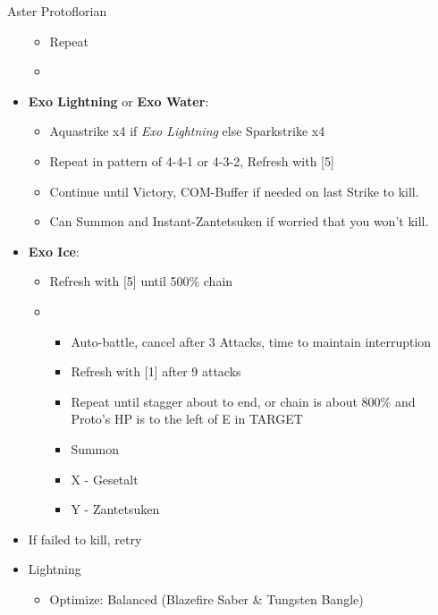 \begin{battle}[1:43]{Aster Protoflorian}
\begin{multicols}{2}
\begin{itemize}
\begin{itemize}
				      \item Repeat
				      \item \stagger
			      \end{itemize}
			\item \textbf{Exo Lightning} or \textbf{Exo Water}:
			      \begin{itemize}
				      \item Aquastrike x4 if \textit{Exo Lightning} else Sparkstrike x4
				      \item Repeat in pattern of 4-4-1 or 4-3-2, Refresh with [5]
				      \item Continue until Victory, COM-Buffer if needed on last Strike to kill.
				      \item Can Summon and Instant-Zantetsuken if worried that you won't kill.
			      \end{itemize}
			\item \textbf{Exo Ice}:
			      \begin{itemize}
				      \item Refresh with [5] until 500\% chain
				      \item \sixth
				            \begin{itemize}
					            \item Auto-battle, cancel after 3 Attacks, time to maintain interruption
					            \item Refresh with [1] after 9 attacks
					            \item Repeat until stagger about to end, or chain is about 800\% and Proto's HP is to the left of E in TARGET
					            \item Summon
					            \item X - Gesetalt
					            \item Y - Zantetsuken
				            \end{itemize}
			      \end{itemize}
			\item If failed to kill, retry
		\end{itemize}
	\end{multicols}
\end{battle}
\begin{multicols}{2}
	\begin{menu}
		\begin{itemize}
			\equip
			\begin{itemize}
				\item Lightning
				      \begin{itemize}
					      \item Optimize: Balanced (Blazefire Saber \& Tungsten Bangle)
				      \end{itemize}
			\end{itemize}
		\end{itemize}
	\end{menu}

	\vfill
\end{multicols}
